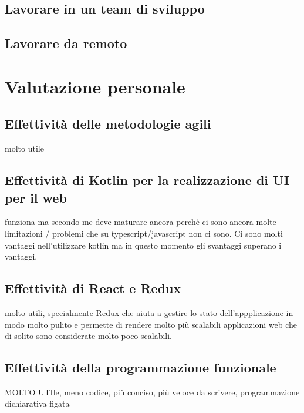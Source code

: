 \subsection{Lavorare in un team di sviluppo}
\subsection{Lavorare da remoto}

\section{Valutazione personale}
\subsection{Effettività delle metodologie agili}
molto utile
\subsection{Effettività di Kotlin per la realizzazione di UI per il web}
funziona ma secondo me deve maturare ancora perchè ci sono ancora molte limitazioni / problemi che su typescript/javascript non ci sono. Ci sono molti vantaggi nell'utilizzare kotlin ma in questo momento gli svantaggi superano i vantaggi.
\subsection{Effettività di React e Redux}
molto utili, specialmente Redux che aiuta a gestire lo stato dell'appplicazione in modo molto pulito e permette di rendere molto più scalabili applicazioni web che di solito sono considerate molto poco scalabili.
\subsection{Effettività della programmazione funzionale}
MOLTO UTIle, meno codice, più conciso, più veloce da scrivere, programmazione dichiarativa figata